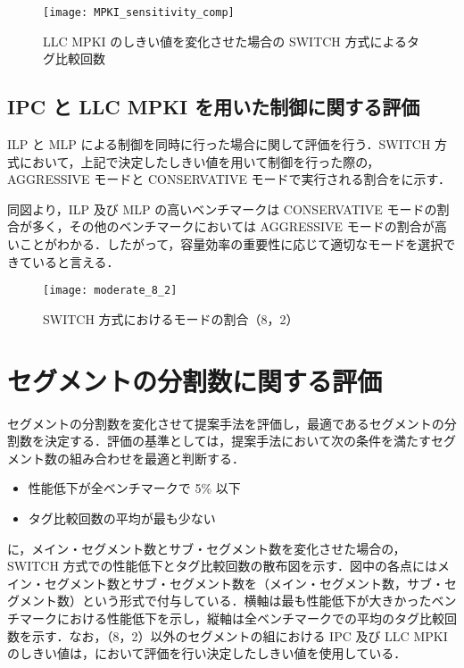\begin{figure}[htb]
  \centering
  \texttt{[image: MPKI\_sensitivity\_comp]}
  \caption{LLC MPKI のしきい値を変化させた場合の SWITCH 方式によるタグ比較回数}
  \label{fig:MPKI_sensitivity_comp}
\end{figure}

\subsection{IPC と LLC MPKI を用いた制御に関する評価}
ILP と MLP による制御を同時に行った場合に関して評価を行う．SWITCH 方式において，上記で決定したしきい値を用いて制御を行った際の，AGGRESSIVE モードと CONSERVATIVE モードで実行される割合をに示す．

同図より，ILP 及び MLP の高いベンチマークは CONSERVATIVE モードの割合が多く，その他のベンチマークにおいては AGGRESSIVE モードの割合が高いことがわかる．したがって，容量効率の重要性に応じて適切なモードを選択できていると言える．

\begin{figure}[htb]
  \centering
  \texttt{[image: moderate\_8\_2]}
  \caption{SWITCH 方式におけるモードの割合（8，2）}
  \label{fig:moderate_8_2}
\end{figure}

\clearpage

\section{セグメントの分割数に関する評価}
\label{sec:eval_ipc_comp}
セグメントの分割数を変化させて提案手法を評価し，最適であるセグメントの分割数を決定する．評価の基準としては，提案手法において次の条件を満たすセグメント数の組み合わせを最適と判断する．
\begin{itemize}
  \item 性能低下が全ベンチマークで 5\% 以下
  \item タグ比較回数の平均が最も少ない
\end{itemize}

に，メイン・セグメント数とサブ・セグメント数を変化させた場合の，SWITCH 方式での性能低下とタグ比較回数の散布図を示す．図中の各点にはメイン・セグメント数とサブ・セグメント数を（メイン・セグメント数，サブ・セグメント数）という形式で付与している．横軸は最も性能低下が大きかったベンチマークにおける性能低下を示し，縦軸は全ベンチマークでの平均のタグ比較回数を示す．なお，（8，2）以外のセグメントの組における IPC 及び LLC MPKI のしきい値は，において評価を行い決定したしきい値を使用している．

